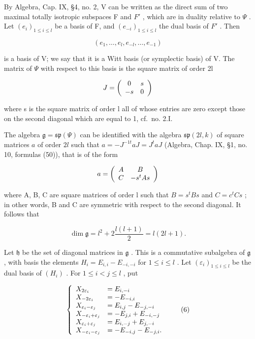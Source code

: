 By Algebra, Cap. IX, §4, no. 2, V can be written as the direct sum of two maximal totally isotropic subspaces F and \(F'\) , which are in duality relative to \(\Psi\) . Let \((e_{i})_{1\leq i\leq l}\) be a basis of F, and \((e_{-i})_{1\leq i\leq l}\) the dual basis of \(F'\) . Then

\[
(e _ {1}, \dots , e _ {l}, e _ {- l}, \dots , e _ {- 1})
\]

is a basis of V; we say that it is a Witt basis (or symplectic basis) of V. The matrix of \(\varPsi\) with respect to this basis is the square matrix of order 2l

\[
J = \left( \begin{array}{c c} 0 & s \\ - s & 0 \end{array} \right)
\]

where s is the square matrix of order l all of whose entries are zero except those on the second diagonal which are equal to 1, cf.~no. 2.I.

The algebra \(\mathfrak{g} = \mathfrak{sp}(\varPsi)\) can be identified with the algebra \(\mathfrak{sp}(2l,k)\) of square matrices \(a\) of order \(2l\) such that \(a = -J^{-1t}aJ = J^t aJ\) (Algebra, Chap. IX, §1, no. 10, formulas (50)), that is of the form

\[
a = \left( \begin{array}{c c} A & B \\ C & - s ^ {t} A s \end{array} \right)
\]

where A, B, C are square matrices of order l such that \(B = s^{t}Bs\) and \(C = c^{t}Cs\) ; in other words, B and C are symmetric with respect to the second diagonal. It follows that

\[
\dim \mathfrak {g} = l ^ {2} + 2 \frac {l (l + 1)}{2} = l (2 l + 1).
\]

Let \(\mathfrak{h}\) be the set of diagonal matrices in \(\mathfrak{g}\) . This is a commutative subalgebra of \(\mathfrak{g}\) , with basis the elements \(H_{i} = E_{i,i} - E_{-i,-i}\) for \(1 \leq i \leq l\) . Let \((\varepsilon_{i})_{1 \leq i \leq l}\) be the dual basis of \((H_{i})\) . For \(1 \leq i < j \leq l\) , put

\[
\left\{ \begin{array}{l l} X _ {2 \varepsilon_ {i}} & = E _ {i, - i} \\ X _ {- 2 \varepsilon_ {i}} & = - E _ {- i, i} \\ X _ {\varepsilon_ {i} - \varepsilon_ {j}} & = E _ {i, j} - E _ {- j, - i} \\ X _ {- \varepsilon_ {i} + \varepsilon_ {j}} & = - E _ {j, i} + E _ {- i, - j} \\ X _ {\varepsilon_ {i} + \varepsilon_ {j}} & = E _ {i, - j} + E _ {j, - i} \\ X _ {- \varepsilon_ {i} - \varepsilon_ {j}} & = - E _ {- i, j} - E _ {- j, i}. \end{array} \right.\tag{6}
\]

